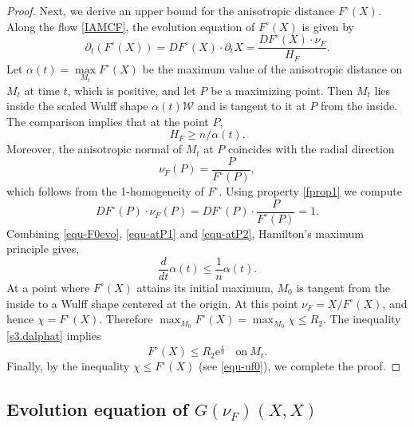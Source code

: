 \documentclass[10pt,a4paper]{amsart}
\numberwithin{equation}{section}
\begin{document}
\begin{proof}
		Next, we derive an upper bound for the anisotropic distance $F^{\circ}(X)$.  Along the flow \eqref{IAMCF}, the evolution equation of $F^{\circ}(X)$ is given by
		\begin{equation}
			\partial_t \left(  F^{\circ}(X) \right) = DF^{\circ}(X)\cdot \partial_t X = \dfrac{DF^{\circ}(X)\cdot \nu_F}{H_F}.
			\label{equ-F0evo}
		\end{equation}
		Let $\alpha(t)=\max\limits_{M_t}F^{\circ}(X)$ be the maximum value of the anisotropic distance on $M_t$ at time $t$, which is positive, and let $P$ be a maximizing point. Then $M_t$ lies inside the scaled Wulff shape $\alpha(t)\mathcal{W}$ and is tangent to it at $P$ from the inside. The comparison implies that at the point $P$, 
		\begin{equation}
			H_F \geq n/\alpha(t).
			\label{equ-atP1}
		\end{equation}
		Moreover, the anisotropic normal of $M_t$ at $P$ coincides with the radial direction
		\begin{equation*}
			\nu_F(P)=\dfrac{P}{F^{\circ}(P)},
		\end{equation*}
		which follows from the 1-homogeneity of $F^{\circ}$. Using property \eqref{fprop1} we compute
		\begin{equation}
			DF^{\circ}(P)\cdot \nu_F(P) = DF^{\circ}(P)\cdot \dfrac{P}{F^{\circ}(P)}=1.
			\label{equ-atP2}
		\end{equation}
		Combining \eqref{equ-F0evo}, \eqref{equ-atP1} and \eqref{equ-atP2}, Hamilton's maximum principle \cite[Lemma 3.5]{Ha86} gives,
		\begin{equation}\label{s3.dalphat}
			\frac{d}{dt}\alpha(t)\leq\frac{1}{n}\alpha(t).
		\end{equation}
		At a point where $F^\circ(X)$ attains its initial maximum, $M_0$ is tangent from the inside to a Wulff shape centered at the origin. At this point $\nu_F=X/F^\circ(X)$, and hence $\chi=F^\circ(X)$. Therefore $\max_{M_0}F^\circ(X)=\max_{M_0}\chi\leq R_2$. The inequality \eqref{s3.dalphat} implies
		\begin{equation*}
			F^{\circ}(X)\leq R_2\mathrm{e}^{\frac{t}{n}}\ \ \ \ \mbox{on}\ M_t.
		\end{equation*}		
		Finally, by the inequality $\chi \leq F^{\circ}(X)$ (see \eqref{equ-uf0}), we complete the proof.
	\end{proof}
	
	\subsection{\texorpdfstring{Evolution equation of $G(\nu_F)(X,X)$}{Evolution equation of G(nuF)(X,X)}}
	
\end{document}
